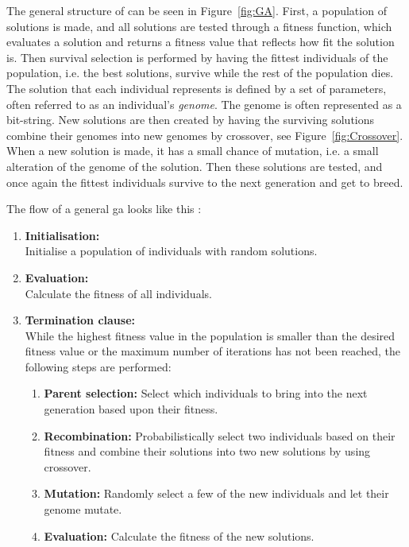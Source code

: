 The general structure of  can be seen in Figure~\ref{fig:GA}. First, a population of solutions is made, and all solutions are tested through a fitness function, which evaluates a solution and returns a fitness value that reflects how fit the solution is. Then survival selection is performed by having the fittest individuals of the population, i.e. the best solutions, survive while the rest of the population dies. The solution that each individual represents is defined by a set of parameters, often referred to as an individual’s \textit{genome}. The genome is often represented as a bit-string. New solutions are then created by having the surviving solutions combine their genomes into new genomes by crossover, see Figure~\ref{fig:Crossover}. When a new solution is made, it has a small chance of mutation, i.e. a small alteration of the genome of the solution. Then these solutions are tested, and once again the fittest individuals survive to the next generation and get to breed.

The flow of a general \ac{ga} looks like this \citep{michalski2013machine}:
\begin{enumerate}[noitemsep]
    \item \textbf{Initialisation:}\\Initialise a population of individuals with random solutions.
    \item \textbf{Evaluation:} \\Calculate the fitness of all individuals.
    \item \textbf{Termination clause:}\\While the highest fitness value in the population is smaller than the desired fitness value or the maximum number of iterations has not been reached, the following steps are performed:
    \begin{enumerate}
        \item \textbf{Parent selection:} Select which individuals to bring into the next generation based upon their fitness.
        \item \textbf{Recombination:} Probabilistically select two individuals based on their fitness and combine their solutions into two new solutions by using crossover.
        \item \textbf{Mutation:} Randomly select a few of the new individuals and let their genome mutate.
        \item \textbf{Evaluation:} Calculate the fitness of the new solutions.
    \end{enumerate}
\end{enumerate}


